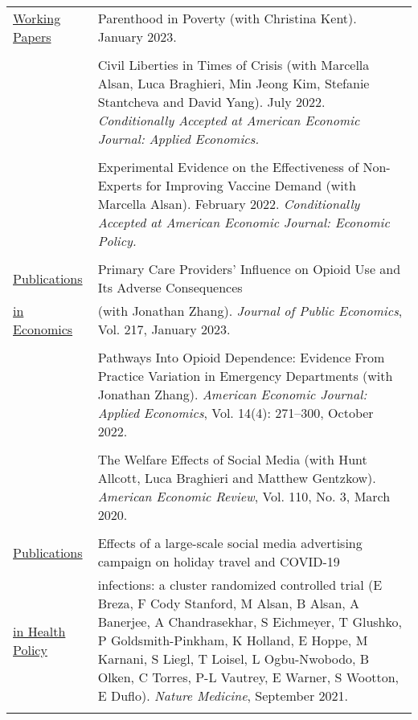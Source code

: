 \documentclass[letterpaper,11pt]{article}
\begin{document}
\begin{footnotesize}
{  \begin{tabularx}{\linewidth}{@{}
    >{\raggedright\arraybackslash\hsize=0.266\hsize}X 
    >{\raggedright\arraybackslash\hsize=1.733\hsize}X
  }
          \underline{Working Papers}  & Parenthood in Poverty (with Christina Kent). January 2023. \\
        & \\
        & Civil Liberties in Times of Crisis (with Marcella Alsan, Luca Braghieri, Min Jeong Kim, Stefanie Stantcheva and David Yang). July 2022. \textit{Conditionally Accepted at American Economic Journal: Applied Economics.} \\
& \\
& Experimental Evidence on the Effectiveness of Non-Experts for Improving Vaccine Demand (with Marcella Alsan). February 2022. \textit{Conditionally Accepted at American Economic Journal: Economic Policy.} \\
        & \\
        \underline{Publications}   & Primary Care Providers’ Influence on Opioid Use and Its Adverse Consequences  \\
        \underline{in Economics}  & (with Jonathan Zhang). \textit{Journal of Public Economics}, Vol. 217, January 2023.   \\
        &  \\
& Pathways Into Opioid Dependence: Evidence From Practice Variation in Emergency Departments (with Jonathan Zhang). \textit{American Economic Journal: Applied Economics}, Vol. 14(4): 271–300, October 2022. \\  
        &  \\      
        & The Welfare Effects of Social Media (with Hunt Allcott, Luca Braghieri and Matthew Gentzkow). \textit{American Economic Review}, Vol. 110, No. 3, March 2020.  \\
        &  \\
 \underline{Publications}         & Effects of a large-scale social media advertising campaign on holiday travel and COVID-19 \\
 \underline{in Health Policy} &  infections: a cluster randomized controlled trial (E Breza, F Cody Stanford, M Alsan, B Alsan, A Banerjee, A Chandrasekhar, S Eichmeyer, T Glushko, P Goldsmith-Pinkham, K Holland, E Hoppe, M Karnani, S Liegl, T Loisel, L Ogbu-Nwobodo, B Olken, C Torres, P-L Vautrey, E Warner, S Wootton, E Duflo).  \textit{Nature Medicine}, September 2021.  \\
        &  \\

\end{tabularx}}
\end{footnotesize}
\end{document}
